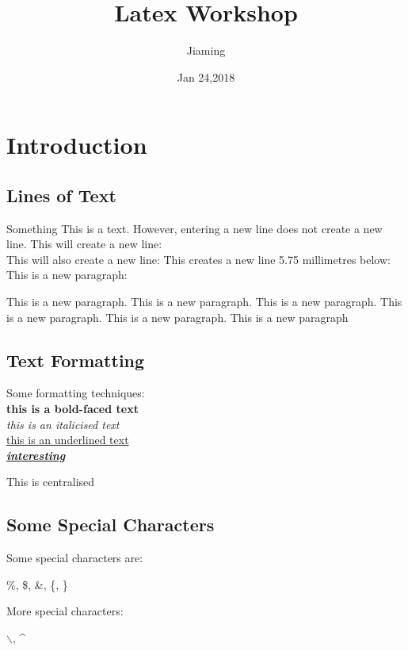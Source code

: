 \documentclass{article} %
\title{Latex Workshop}
\date{Jan 24,2018}
\author{Jiaming}
\begin{document}
	\maketitle %
	\tableofcontents %
	\newpage %
	\section{Introduction}
		\subsection{Lines of Text}
			\hspace{4mm} Something This is a text. However,
			entering
			a 
			new line
			does not create a new line. 
			This will create a new line: \\
			This will also create a new line: \newline
			This creates a new line 5.75 millimetres below:	\\[5.75mm]
			This is a new paragraph: 
			\par This is a new paragraph. This is a new paragraph. This is a new paragraph. This is a new paragraph. This is a new paragraph. This is a new paragraph
		\subsection{Text Formatting}
			Some formatting techniques:\\[3mm]
			\textbf{this is a bold-faced text}\\[3mm]
			\emph{this is an italicised text}\\[3mm]
			\underline{this is an underlined text}\\[3mm]
			\textbf{\emph{\underline{interesting}}}
			\begin{center}
				This is centralised
			\end{center}
		\subsection{Some Special Characters}
			Some special characters are:
			\begin{center}
				\%, \$, \&, \{, \}
			\end{center}
			More special characters:
			\begin{center}
			$\backslash$, \^{} %
			\end{center}
			 
\end{document}
